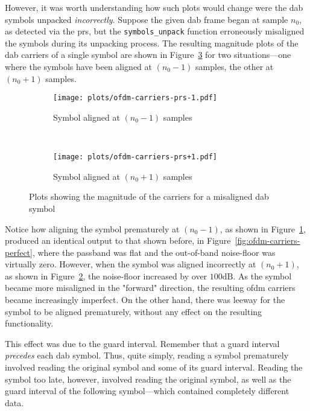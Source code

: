 \documentclass[class=report,11pt,crop=false]{standalone}
\begin{document}
However, it was worth understanding how such plots would change were the \gls{dab} symbols unpacked \emph{incorrectly}. Suppose the given \gls{dab} frame began at sample \(n_0\), as detected via the \gls{prs}, but the \texttt{symbols\_unpack} function erroneously misaligned the symbols during its unpacking process. The resulting magnitude plots of the \gls{dab} carriers of a single symbol are shown in Figure~\ref{fig:ofdm-carriers-prs} for two situations---one where the symbols have been aligned at \((n_0 - 1)\) samples, the other at \((n_0 + 1)\) samples.

\begin{figure}[htbp]
    \centering
    \captionsetup{type=figure}
    \begin{subfigure}[t]{0.45\textwidth}
      \centering
      \captionsetup{type=figure}
      \texttt{[image: plots/ofdm-carriers-prs-1.pdf]}
      \caption{Symbol aligned at \((n_0 - 1)\) samples}
      \label{fig:ofdm-carriers-prs-1}
    \end{subfigure}%
    ~ 
    \begin{subfigure}[t]{0.45\textwidth}
      \centering
      \captionsetup{type=figure}
      \texttt{[image: plots/ofdm-carriers-prs+1.pdf]}
      \caption{Symbol aligned at \((n_0 + 1)\) samples}
      \label{fig:ofdm-carriers-prs+1}
    \end{subfigure}
    \caption{Plots showing the magnitude of the  carriers for a misaligned \gls{dab} symbol}
    \label{fig:ofdm-carriers-prs}
  \end{figure}

Notice how aligning the symbol prematurely at \((n_0 - 1)\), as shown in Figure~\ref{fig:ofdm-carriers-prs-1}, produced an identical output to that shown before, in Figure~\ref{fig:ofdm-carriers-perfect}, where the passband was flat and the out-of-band noise-floor was virtually zero. However, when the symbol was aligned incorrectly at \((n_0 + 1)\), as shown in Figure~\ref{fig:ofdm-carriers-prs+1}, the noise-floor increased by over \(100\si{\deci\bel}\). As the symbol became more misaligned in the "forward" direction, the resulting \gls{ofdm} carriers became increasingly imperfect. On the other hand, there was leeway for the symbol to be aligned prematurely, without any effect on the resulting functionality.

This effect was due to the guard interval. Remember that a guard interval \emph{precedes} each \gls{dab} symbol. Thus, quite simply, reading a symbol prematurely involved reading the original symbol and some of its guard interval. Reading the symbol too late, however, involved reading the original symbol, as well as the guard interval of the following symbol---which contained completely different data.
\end{document}
